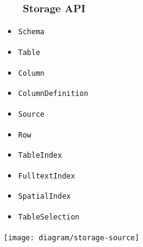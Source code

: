 \documentclass[
    aspectratio=169,
]{beamer}
\newcommand{\slidetitle}[2]{\frametitle{{\small #1 ~ \ding{226} ~ } \normalsize \textbf{#2} }}
\begin{document}
\begin{frame}
    \slidetitle{\sectionshorttitle}{Storage API}
    
    \begin{minipage}[c]{0.5\textwidth}
        \begin{itemize}
            \item \texttt{Schema}
            \item \texttt{Table}
            \item \texttt{Column}
            \item \texttt{ColumnDefinition}
            \item {\texttt{Source}}
            \item \texttt{Row}
            \item \texttt{TableIndex}
            \item \texttt{FulltextIndex}
            \item \texttt{SpatialIndex}
            \item \texttt{TableSelection}
        \end{itemize}
    \end{minipage}%
    \begin{minipage}[c]{0.5\textwidth}
        \begin{overprint}
            \centerline{\texttt{[image: diagram/storage-source]}}
        \end{overprint}
    \end{minipage}
\end{frame}
\end{document}
